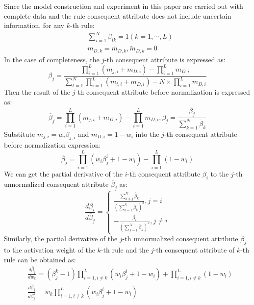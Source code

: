 \documentclass{ieeeaccess}
\begin{document}
Since the model construction and experiment in this paper are carried out with complete data and
the rule consequent attribute does not include uncertain information, for any $k$-th rule:
\begin{align}
     & \sum_{i=1}^N\beta_{ik}=1(k=1,\cdots,L)           \\
     & m_{D,k}=\overline{m}_{D,k},\widetilde{m}_{D,k}=0
\end{align}
In the case of completeness, the $j$-th consequent attribute is expressed as:
\begin{equation}
    \beta_j=\frac{\prod_{i=1}^L(m_{j,i}+m_{D,i})-\prod_{i=1}^Lm_{D,i}}{\sum_{t=1}^N\prod_{i=1}^L(m_{t,i}+m_{D,i})-N\times\prod_{i=1}^Lm_{D,i}}
\end{equation}
Then the result of the $j$-th consequent attribute before normalization is expressed as:
\begin{equation}
    \overline{\beta}_j = \prod_{i=1}^L(m_{j,i}+m_{D,i})-\prod_{i=1}^Lm_{D,i},\beta_j=\frac{\overline{\beta}_j}{\sum_{k=1}^N\overline{\beta}_k}
\end{equation}
Substitute $m_{j,i}=w_i\beta_{j,i}$ and $m_{D,i}=1-w_i$ into the $j$-th consequent attribute before normalization expression:
\begin{equation}
    \overline{\beta}_j = \prod_{i=1}^L(w_i\beta_j^i+1-w_i)-\prod_{i=1}^L{(1-w_i)}
\end{equation}
We can get the partial derivative of the $i$-th consequent attribute $\beta_i$ to the $j$-th unnormalized consequent attribute $\overline{\beta}_j$ as:
\begin{equation}
    \frac{d\beta_i}{d\overline{\beta}_j}=
    \left\{
    \begin{aligned}
        \frac{\sum_{k\neq j}^N\overline{\beta}_k}{(\sum_{k=1}^N\overline{\beta}_k)^2},j=i \\
        -\frac{\beta_i}{(\sum_{k=1}^N\overline{\beta}_k)^2},j\neq i
    \end{aligned}
    \right.
\end{equation}
Similarly, the partial derivative of the $j$-th unnormalized consequent attribute $\overline{\beta}_j$ to the activation weight of the $k$-th rule and the $j$-th consequent attribute of $k$-th rule can be obtained as:
\begin{align}
     & \frac{d\overline{\beta}_j}{dw_k}=(\beta_j^k-1)\prod_{i=1,i\neq k}^L(w_i\beta_j^i+1-w_i)+\prod_{i=1,i\neq k}^L(1-w_i) \\
     & \frac{d\overline{\beta}_j}{d\beta_j^k}=w_k\prod_{i=1,i\neq k}^L(w_i\beta_j^i+1-w_i)
\end{align}
\end{document}
